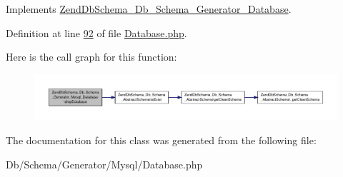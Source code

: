 Implements \hyperlink{interfaceZendDbSchema__Db__Schema__Generator__Database_acd0cfc49f30c3bbbae29f0f748c1c428}{Zend\-Db\-Schema\-\_\-\-Db\-\_\-\-Schema\-\_\-\-Generator\-\_\-\-Database}.



Definition at line \hyperlink{Generator_2Mysql_2Database_8php_source_l00092}{92} of file \hyperlink{Generator_2Mysql_2Database_8php_source}{Database.\-php}.



Here is the call graph for this function\-:\nopagebreak
\begin{figure}[H]
\begin{center}
\leavevmode
\includegraphics[width=350pt]{classZendDbSchema__Db__Schema__Generator__Mysql__Database_a94a1d9e8d2eaa3740bd9b62cc3a8973e_cgraph}
\end{center}
\end{figure}




The documentation for this class was generated from the following file\-:\begin{DoxyCompactItemize}
\item 
Db/\-Schema/\-Generator/\-Mysql/Database.\-php\end{DoxyCompactItemize}

